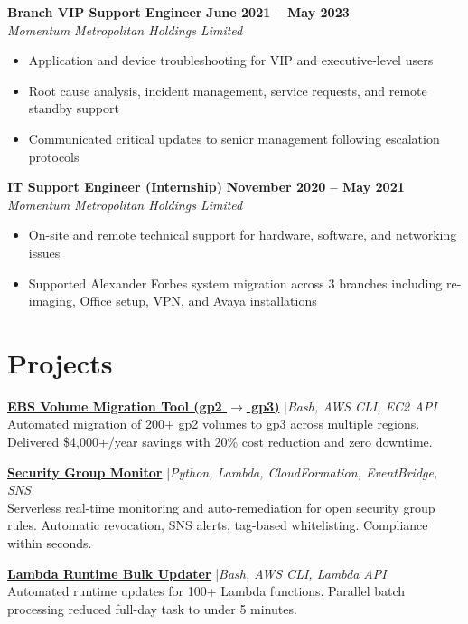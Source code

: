 \documentclass[11pt,a4paper]{article}
\begin{document}
\newpage
\textbf{Branch VIP Support Engineer} \hfill \textbf{June 2021 -- May 2023}\\
\textit{Momentum Metropolitan Holdings Limited}
\begin{itemize}
  \item Application and device troubleshooting for VIP and executive-level users
  \item Root cause analysis, incident management, service requests, and remote standby support
  \item Communicated critical updates to senior management following escalation protocols
\end{itemize}

\textbf{IT Support Engineer (Internship)} \hfill \textbf{November 2020 -- May 2021}\\
\textit{Momentum Metropolitan Holdings Limited}
\begin{itemize}
  \item On-site and remote technical support for hardware, software, and networking issues
  \item Supported Alexander Forbes system migration across 3 branches including re-imaging, Office setup, VPN, and Avaya installations
\end{itemize}

\section{Projects}

\href{https://github.com/mamathebula/EBS-Volume-Migration-gp2-to-gp3.git}{\color{linkblue}\textbf{EBS Volume Migration Tool (gp2 $\rightarrow$ gp3)}} \enspace|\enspace \textit{Bash, AWS CLI, EC2 API}\\
Automated migration of 200+ gp2 volumes to gp3 across multiple regions. Delivered \$4,000+/year savings with 20\% cost reduction and zero downtime.

\href{https://github.com/mamathebula/security-group-monitor}{\color{linkblue}\textbf{Security Group Monitor}} \enspace|\enspace \textit{Python, Lambda, CloudFormation, EventBridge, SNS}\\
Serverless real-time monitoring and auto-remediation for open security group rules. Automatic revocation, SNS alerts, tag-based whitelisting. Compliance within seconds.

\href{https://github.com/mamathebula/-Lambda-Runtime-Bulk-Updater.git}{\color{linkblue}\textbf{Lambda Runtime Bulk Updater}} \enspace|\enspace \textit{Bash, AWS CLI, Lambda API}\\
Automated runtime updates for 100+ Lambda functions. Parallel batch processing reduced full-day task to under 5 minutes.
\end{document}

